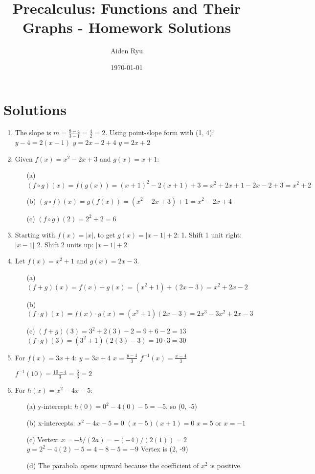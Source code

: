 \documentclass[12pt]{article}
\title{Precalculus: Functions and Their Graphs - Homework Solutions}
\author{Aiden Ryu}
\date{\today}
\begin{document}
\maketitle

\section*{Solutions}

\begin{enumerate}

\item The slope is $m = \frac{8-4}{3-1} = \frac{4}{2} = 2$. Using point-slope form with (1, 4):
   $y - 4 = 2(x - 1)$
   $y = 2x - 2 + 4$
   $y = 2x + 2$

\item Given $f(x) = x^2 - 2x + 3$ and $g(x) = x + 1$:
\begin{itemize}
    \item[(a)] $(f \circ g)(x) = f(g(x)) = (x+1)^2 - 2(x+1) + 3 = x^2 + 2x + 1 - 2x - 2 + 3 = x^2 + 2$
    \item[(b)] $(g \circ f)(x) = g(f(x)) = (x^2 - 2x + 3) + 1 = x^2 - 2x + 4$
    \item[(c)] $(f \circ g)(2) = 2^2 + 2 = 6$
\end{itemize}

\item Starting with $f(x) = |x|$, to get $g(x) = |x - 1| + 2$:
   1. Shift 1 unit right: $|x - 1|$
   2. Shift 2 units up: $|x - 1| + 2$

\item Let $f(x) = x^2 + 1$ and $g(x) = 2x - 3$.
\begin{itemize}
    \item[(a)] $(f + g)(x) = f(x) + g(x) = (x^2 + 1) + (2x - 3) = x^2 + 2x - 2$
    \item[(b)] $(f \cdot g)(x) = f(x) \cdot g(x) = (x^2 + 1)(2x - 3) = 2x^3 - 3x^2 + 2x - 3$
    \item[(c)] $(f + g)(3) = 3^2 + 2(3) - 2 = 9 + 6 - 2 = 13$
               $(f \cdot g)(3) = (3^2 + 1)(2(3) - 3) = 10 \cdot 3 = 30$
\end{itemize}

\item For $f(x) = 3x + 4$:
   $y = 3x + 4$
   $x = \frac{y-4}{3}$
   $f^{-1}(x) = \frac{x-4}{3}$
   
   $f^{-1}(10) = \frac{10-4}{3} = \frac{6}{3} = 2$

\item For $h(x) = x^2 - 4x - 5$:
\begin{itemize}
    \item[(a)] y-intercept: $h(0) = 0^2 - 4(0) - 5 = -5$, so (0, -5)
    \item[(b)] x-intercepts: $x^2 - 4x - 5 = 0$
               $(x-5)(x+1) = 0$
               $x = 5$ or $x = -1$
    \item[(c)] Vertex: $x = -b/(2a) = -(-4)/(2(1)) = 2$
               $y = 2^2 - 4(2) - 5 = 4 - 8 - 5 = -9$
               Vertex is (2, -9)
    \item[(d)] The parabola opens upward because the coefficient of $x^2$ is positive.
\end{itemize}


\end{enumerate}
\end{document}
